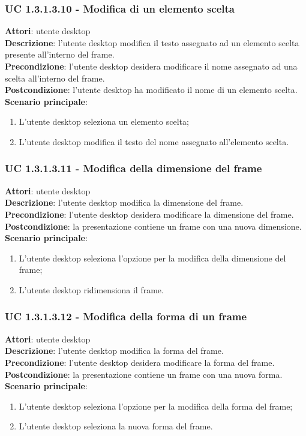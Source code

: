 \subsubsection{UC 1.3.1.3.10 - Modifica di un elemento scelta}{
	\label{uc1.3.1.3.10}
	\textbf{Attori}: utente desktop \\
	\textbf{Descrizione}: l'utente desktop modifica il testo assegnato ad un elemento scelta presente all'interno del frame. \\
	\textbf{Precondizione}: l'utente desktop desidera modificare il nome assegnato ad una scelta all'interno del frame.	\\
	\textbf{Postcondizione}: l'utente desktop ha modificato il nome di un elemento scelta.	\\
	\textbf{Scenario principale}:
	\begin{enumerate}
		\item L'utente desktop seleziona un elemento scelta;
		\item L'utente desktop modifica il testo del nome assegnato all'elemento scelta.
	\end{enumerate}
	}
\subsubsection{UC 1.3.1.3.11 - Modifica della dimensione del frame}{
	\label{uc1.3.1.3.11}
	\textbf{Attori}: utente desktop \\
	\textbf{Descrizione}: l'utente desktop modifica la dimensione del frame. \\
	\textbf{Precondizione}: l'utente desktop desidera modificare la dimensione del frame.	\\
	\textbf{Postcondizione}: la presentazione contiene un frame con una nuova dimensione.	\\
	\textbf{Scenario principale}:
	\begin{enumerate}
		\item L'utente desktop seleziona l'opzione per la modifica della dimensione del frame;
		\item L'utente desktop ridimensiona il frame.
	\end{enumerate}
	}
\subsubsection{UC 1.3.1.3.12 - Modifica della forma di un frame}{
	\label{uc1.3.1.3.12}
	\textbf{Attori}: utente desktop \\
	\textbf{Descrizione}: l'utente desktop modifica la forma del frame. \\
	\textbf{Precondizione}: l'utente desktop desidera modificare la forma del frame.	\\
	\textbf{Postcondizione}: la presentazione contiene un frame con una nuova forma.	\\
	\textbf{Scenario principale}:
	\begin{enumerate}
		\item L'utente desktop seleziona l'opzione per la modifica della forma del frame;
		\item L'utente desktop seleziona la nuova forma del frame.
	\end{enumerate}
	}
